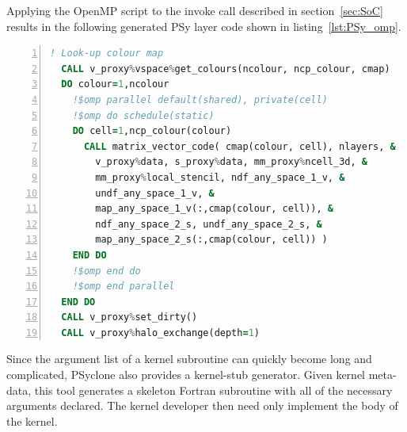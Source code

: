 \documentclass[review,times]{elsarticle}
\begin{document}
%
%
%
%

Applying the OpenMP script to the invoke call described in
section~\ref{sec:SoC} results in the following generated PSy layer
code shown in listing~\ref{lst:PSy_omp}. 
\begin{lstlisting}[language=Fortran, numbers=left,caption={Code 
fragment of the generated PSy layer},label={lst:PSy_omp}]
  ! Look-up colour map
  CALL v_proxy%vspace%get_colours(ncolour, ncp_colour, cmap)
  DO colour=1,ncolour
    !$omp parallel default(shared), private(cell)
    !$omp do schedule(static)
    DO cell=1,ncp_colour(colour)
      CALL matrix_vector_code( cmap(colour, cell), nlayers, &
        v_proxy%data, s_proxy%data, mm_proxy%ncell_3d, & 
        mm_proxy%local_stencil, ndf_any_space_1_v, &
        undf_any_space_1_v, &
        map_any_space_1_v(:,cmap(colour, cell)), &
        ndf_any_space_2_s, undf_any_space_2_s, &
        map_any_space_2_s(:,cmap(colour, cell)) )
    END DO 
    !$omp end do
    !$omp end parallel
  END DO 
  CALL v_proxy%set_dirty()
  CALL v_proxy%halo_exchange(depth=1)
\end{lstlisting}

Since the argument list of a kernel subroutine can quickly become long
and complicated, PSyclone also provides a kernel-stub generator. Given
kernel meta-data, this tool generates a skeleton Fortran subroutine
with all of the necessary arguments declared. The kernel developer
then need only implement the body of the kernel.
\end{document}
